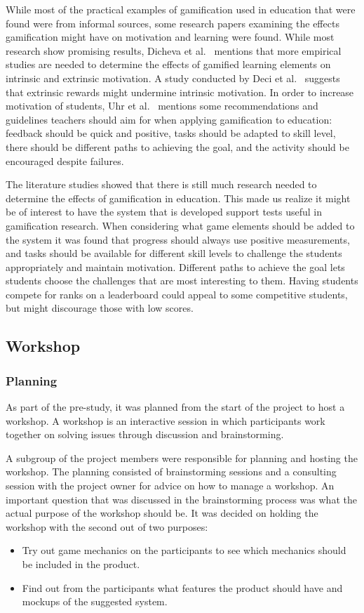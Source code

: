 While most of the practical examples of gamification used in education that were found were from informal sources, some research papers examining the effects gamification might have on motivation and learning were found. While most research show promising results, Dicheva et al.~\cite{ref:dicheva} mentions that more empirical studies are needed to determine the effects of gamified learning elements on intrinsic and extrinsic motivation. A study conducted by Deci et al.~\cite{ref:deci} suggests that extrinsic rewards might undermine intrinsic motivation. In order to increase motivation of students, Uhr et al.~\cite{ref:uhr} mentions some recommendations and guidelines teachers should aim for when applying gamification to education: feedback should be quick and positive, tasks should be adapted to skill level, there should be different paths to achieving the goal, and the activity should be encouraged despite failures.

The literature studies showed that there is still much research needed to determine the effects of gamification in education. This made us realize it might be of interest to have the system that is developed support tests useful in gamification research. When considering what game elements should be added to the system it was found that progress should always use positive measurements, and tasks should be available for different skill levels to challenge the students appropriately and maintain motivation. Different paths to achieve the goal lets students choose the challenges that are most interesting to them. Having students compete for ranks on a leaderboard could appeal to some competitive students, but might discourage those with low scores.

\subsection{Workshop}
\subsubsection{Planning}
As part of the pre-study, it was planned from the start of the project to host a workshop. A workshop is an interactive session in which participants work together on solving issues through discussion and brainstorming\cite{workshop}. 

A subgroup of the project members were responsible for planning and hosting the workshop. The planning consisted of brainstorming sessions and a consulting session with the project owner for advice on how to manage a workshop. An important question that was discussed in the brainstorming process was what the actual purpose of the workshop should be. It was decided on holding the workshop with the second out of two purposes:
\begin{itemize}  
    \item Try out game mechanics on the participants to see which mechanics should be included in the product.
    \item Find out from the participants what features the product should have and mockups of the suggested system. 
\end{itemize}

